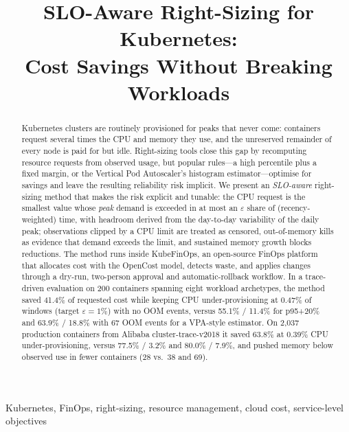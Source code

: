 \documentclass[conference]{IEEEtran}
\newcommand{\todo}[1]{\textcolor{red}{[TODO: #1]}}
\begin{document}
\title{SLO-Aware Right-Sizing for Kubernetes:\\Cost Savings Without Breaking Workloads}

\author{
\IEEEauthorblockN{\todo{Author 1}, \todo{Author 2}, \todo{Author 3}, \todo{Author 4}}
\IEEEauthorblockA{\todo{Department, Institute}\\\todo{emails}}
}

\maketitle

\begin{abstract}
Kubernetes clusters are routinely provisioned for peaks that never come: containers request several times
the CPU and memory they use, and the unreserved remainder of every node is paid for but idle. Right-sizing
tools close this gap by recomputing resource requests from observed usage, but popular rules---a high
percentile plus a fixed margin, or the Vertical Pod Autoscaler's histogram estimator---optimise for savings and
leave the resulting reliability risk implicit. We present an \emph{SLO-aware} right-sizing method that makes the
risk explicit and tunable: the CPU request is the smallest value whose \emph{peak} demand is exceeded in at most
an $\varepsilon$ share of (recency-weighted) time, with headroom derived from the day-to-day variability of the
daily peak; observations clipped by a CPU limit are treated as censored, out-of-memory kills as evidence that
demand exceeds the limit, and sustained memory growth blocks reductions. The method runs inside KubeFinOps, an
open-source FinOps platform that allocates cost with the OpenCost model, detects waste, and applies changes
through a dry-run, two-person approval and automatic-rollback workflow. In a trace-driven evaluation on 200
containers spanning eight workload archetypes, the method saved 41.4\% of requested cost while keeping CPU
under-provisioning at 0.47\% of windows (target $\varepsilon = 1\%$) with no OOM events, versus 55.1\% / 11.4\% for
p95+20\% and 63.9\% / 18.8\% with 67 OOM events for a VPA-style estimator. On 2,037 production containers
from Alibaba cluster-trace-v2018 it saved 63.8\% at 0.39\% CPU under-provisioning, versus 77.5\% / 3.2\% and
80.0\% / 7.9\%, and pushed memory below observed use in fewer containers (28 vs.\ 38 and 69).
\end{abstract}

\begin{IEEEkeywords}
Kubernetes, FinOps, right-sizing, resource management, cloud cost, service-level objectives
\end{IEEEkeywords}
\end{document}

